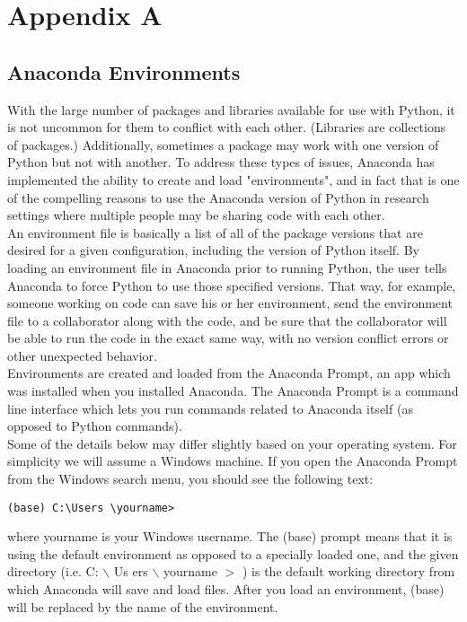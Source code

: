 
\chapter*{Appendix A}
\section*{Anaconda Environments}
With the large number of packages and libraries available for use with Python, it is not uncommon for them to conflict with each other. (Libraries are collections of packages.) Additionally, sometimes a package may work with one version of Python but not with another. To address these types of issues, Anaconda has implemented the ability to create and load "environments", and in fact that is one of the compelling reasons to use the Anaconda version of Python in research settings where multiple people may be sharing code with each other.\\

An environment file is basically a list of all of the package versions that are desired for a given configuration, including the version of Python itself. By loading an environment file in Anaconda prior to running Python, the user tells Anaconda to force Python to use those specified versions. That way, for example, someone working on code can save his or her environment, send the environment file to a collaborator along with the code, and be sure that the collaborator will be able to run the code in the exact same way, with no version conflict errors or other unexpected behavior.\\

Environments are created and loaded from the Anaconda Prompt, an app which was installed when you installed Anaconda. The Anaconda Prompt is a command line interface which lets you run commands related to Anaconda itself (as opposed to Python commands).\\

Some of the details below may differ slightly based on your operating system. For simplicity we will assume a Windows machine. If you open the Anaconda Prompt from the Windows search menu, you should see the following text:\\
\begin{lstlisting}
(base) C:\Users \yourname>
\end{lstlisting}
where yourname is your Windows username. The (base) prompt means that it is using the default environment as opposed to a specially loaded one, and the given directory (i.e. C: $\backslash$ Us ers $\backslash$ yourname $>$ ) is the default working directory from which Anaconda will save and load files. After you load an environment, (base) will be replaced by the name of the environment.

